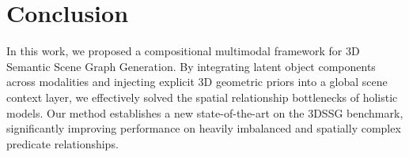\documentclass[letterpaper]{article}
\begin{document}
\begin{table}[h]
\centering
\caption{Performance comparison on the 3DSSG benchmark.}
\label{tab:results}
\end{table}

\section{Conclusion}
In this work, we proposed a compositional multimodal framework for 3D Semantic Scene Graph Generation. By integrating latent object components across modalities and injecting explicit 3D geometric priors into a global scene context layer, we effectively solved the spatial relationship bottlenecks of holistic models. Our method establishes a new state-of-the-art on the 3DSSG benchmark, significantly improving performance on heavily imbalanced and spatially complex predicate relationships.
\end{document}
